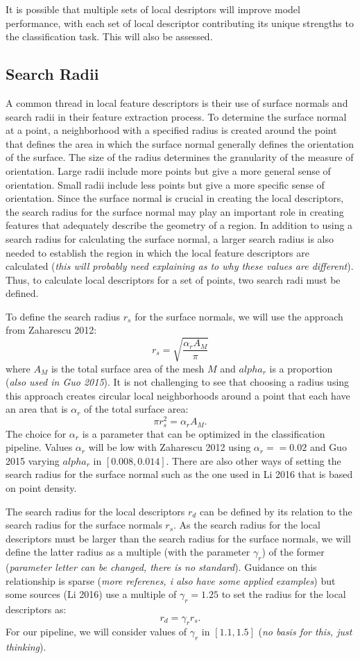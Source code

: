 \documentclass[11pt]{article}
\theoremstyle{definition}
\begin{document}
It is possible that multiple sets of local desriptors will improve model performance, with each set of local descriptor contributing its unique strengths to the classification task. This will also be assessed.

\subsection{Search Radii}

A common thread in local feature descriptors is their use of surface normals and search radii in their feature extraction process. To determine the surface normal at a point, a neighborhood with a specified radius is created around the point that defines the area in which the surface normal generally defines the orientation of the surface. The size of the radius determines the granularity of the measure of orientation. Large radii include more points but give a more general sense of orientation. Small radii include less points but give a more specific sense of orientation. Since the surface normal is crucial in creating the local descriptors, the search radius for the surface normal may play an important role in creating features that adequately describe the geometry of a region. In addition to using a search radius for calculating the surface normal, a larger search radius is also needed to establish the region in which the local feature descriptors are calculated (\textit{this will probably need explaining as to why these values are different}). Thus, to calculate local descriptors for a set of points, two search radi must be defined. 

To define the search radius $r_s$ for the surface normals, we will use the approach from Zaharescu 2012:
$$r_s = \sqrt{\frac{\alpha_r A_M}{\pi}}$$
where $A_M$ is the total surface area of the mesh $M$ and $alpha_r$ is a proportion (\textit{also used in Guo 2015}). It is not challenging to see that choosing a radius using this approach creates circular local neighborhoods around a point that each have an area that is $\alpha_r$ of the total surface area:
$$\pi r_s^2 = \alpha_r A_M.$$
The choice for $\alpha_r$ is a parameter that can be optimized in the classification pipeline. Values $\alpha_r$ will be low with Zaharescu 2012 using $\alpha_r == 0.02$ and Guo 2015 varying $alpha_r$ in $[0.008, 0.014]$. There are also other ways of setting the search radius for the surface normal such as the one used in Li 2016 that is based on point density. 

The search radius for the local descriptors $r_d$ can be defined by its relation to the search radius for the surface normals $r_s$. As the search radius for the local descriptors must be larger than the search radius for the surface normals, we will define the latter radius as a multiple (with the parameter $\gamma_r$) of the former (\textit{parameter letter can be changed, there is no standard}). Guidance on this relationship is sparse (\textit{more referenes, i also have some applied examples}) but some sources (Li 2016) use a multiple of $\gamma_r = 1.25$ to set the radius for the local descriptors as:
$$r_d = \gamma_r r_s.$$
For our pipeline, we will consider values of $\gamma_r$ in $[1.1, 1.5]$ (\textit{no basis for this, just thinking}). 
\end{document}
